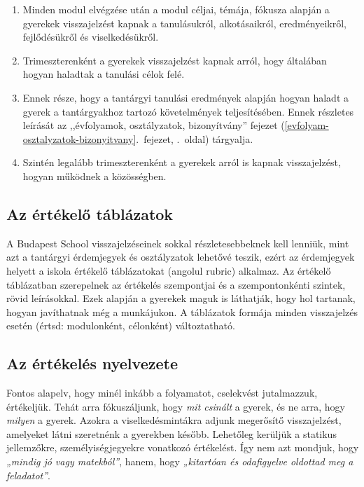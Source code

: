 \begin{enumerate}
\def\labelenumi{\arabic{enumi}.}
\item
  Minden modul elvégzése után a modul céljai, témája, fókusza alapján a
  gyerekek visszajelzést kapnak a tanulásukról, alkotásaikról,
  eredményeikről, fejlődésükről és viselkedésükről.
\item
  Trimeszterenként a gyerekek visszajelzést kapnak arról, hogy
  általában hogyan haladtak a tanulási célok felé.
\item
  Ennek része, hogy a tantárgyi tanulási eredmények alapján hogyan
  haladt a gyerek a tantárgyakhoz tartozó követelmények teljesítésében.
  Ennek részletes leírását az
  ,,évfolyamok, osztályzatok, bizonyítvány'' fejezet (\ref{evfolyam-osztalyzatok-bizonyitvany}.~fejezet, \pageref{evfolyam-osztalyzatok-bizonyitvany}.~oldal) tárgyalja.
\item
  Szintén legalább trimeszterenként a gyerekek arról is kapnak
  visszajelzést, hogyan működnek a közösségben.
\end{enumerate}

\hypertarget{az-ertekelo-tablazatok}{%
\subsection{Az értékelő táblázatok}\label{az-ertekelo-tablazatok}}

A Budapest School visszajelzéseinek sokkal részletesebbeknek kell
lenniük, mint azt a tantárgyi érdemjegyek és osztályzatok lehetővé
teszik, ezért az érdemjegyek helyett a iskola értékelő táblázatokat
(angolul rubric) alkalmaz. Az értékelő táblázatban szerepelnek az
értékelés szempontjai és a szempontonkénti szintek, rövid leírásokkal.
Ezek alapján a gyerekek maguk is láthatják, hogy hol tartanak, hogyan
javíthatnak még a munkájukon. A táblázatok formája minden visszajelzés
esetén (értsd: modulonként, célonként) változtatható.

\hypertarget{ertekeles-nyelvezete}{%
\subsection{Az értékelés nyelvezete}\label{ertekeles-nyelvezete}}

Fontos alapelv, hogy minél inkább a folyamatot, cselekvést jutalmazzuk,
értékeljük. Tehát arra fókuszáljunk, hogy \emph{mit csinált} a gyerek,
és ne arra, hogy \emph{milyen} a gyerek. Azokra a viselkedésmintákra
adjunk megerősítő visszajelzést, amelyeket látni szeretnénk a gyerekben
később. Lehetőleg kerüljük a statikus jellemzőkre, személyiségjegyekre
vonatkozó értékelést. Így nem azt mondjuk, hogy \emph{„mindig jó vagy
matekból''}, hanem, hogy \emph{„kitartóan és odafigyelve oldottad meg a
feladatot''}.

